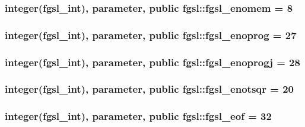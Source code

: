 \hypertarget{classfgsl_a70b026317b5a6f797b14978468ca01d9}{
\subsubsection[{fgsl\-\_\-enomem}]{\setlength{\rightskip}{0pt plus 5cm}integer({\bf fgsl\-\_\-int}), parameter, public fgsl\-::fgsl\-\_\-enomem = 8}}\label{classfgsl_a70b026317b5a6f797b14978468ca01d9}
\hypertarget{classfgsl_a11266b4068f90334758a26d35c116f73}{
\subsubsection[{fgsl\-\_\-enoprog}]{\setlength{\rightskip}{0pt plus 5cm}integer({\bf fgsl\-\_\-int}), parameter, public fgsl\-::fgsl\-\_\-enoprog = 27}}\label{classfgsl_a11266b4068f90334758a26d35c116f73}
\hypertarget{classfgsl_ad9567598ce07cacf43815d0453e649bb}{
\subsubsection[{fgsl\-\_\-enoprogj}]{\setlength{\rightskip}{0pt plus 5cm}integer({\bf fgsl\-\_\-int}), parameter, public fgsl\-::fgsl\-\_\-enoprogj = 28}}\label{classfgsl_ad9567598ce07cacf43815d0453e649bb}
\hypertarget{classfgsl_a0ad3f5a5023fcd60f764cab3b2b07984}{
\subsubsection[{fgsl\-\_\-enotsqr}]{\setlength{\rightskip}{0pt plus 5cm}integer({\bf fgsl\-\_\-int}), parameter, public fgsl\-::fgsl\-\_\-enotsqr = 20}}\label{classfgsl_a0ad3f5a5023fcd60f764cab3b2b07984}
\hypertarget{classfgsl_a9641f79a70406a1c9f483f01fdb1ccfa}{
\subsubsection[{fgsl\-\_\-eof}]{\setlength{\rightskip}{0pt plus 5cm}integer({\bf fgsl\-\_\-int}), parameter, public fgsl\-::fgsl\-\_\-eof = 32}}\label{classfgsl_a9641f79a70406a1c9f483f01fdb1ccfa}
